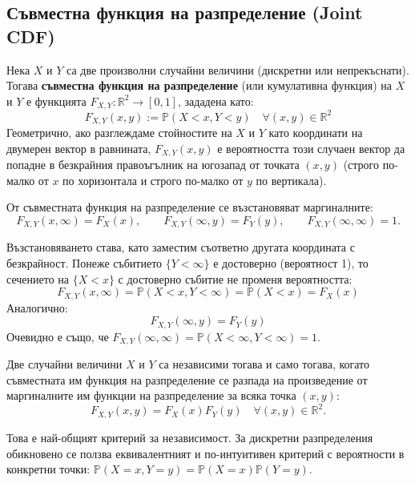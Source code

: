\subsection{Съвместна функция на разпределение (Joint CDF)}

\begin{defn}
Нека $X$ и $Y$ са две произволни случайни величини (дискретни или непрекъснати). Тогава \textbf{съвместна функция на разпределение} (или кумулативна функция) на $X$ и $Y$ е функцията $F_{X,Y} : \mathbb{R}^2 \to [0, 1]$, зададена като:
\[
F_{X,Y}(x,y) := \mathbb{P}(X < x, Y < y) \quad \forall (x,y) \in \mathbb{R}^2
\]
Геометрично, ако разглеждаме стойностите на $X$ и $Y$ като координати на двумерен вектор в равнината, $F_{X,Y}(x,y)$ е вероятността този случаен вектор да попадне в безкрайния правоъгълник на югозапад от точката $(x, y)$ (строго по-малко от $x$ по хоризонтала и строго по-малко от $y$ по вертикала).
\end{defn}

\begin{prop}\label{prop:marginal-from-joint}
От съвместната функция на разпределение се възстановяват маргиналните:
\[
F_{X,Y}(x, \infty) = F_X(x), \qquad F_{X,Y}(\infty, y) = F_Y(y), \qquad F_{X,Y}(\infty, \infty) = 1 .
\]
\end{prop}

Възстановяването става, като заместим съответно другата координата с безкрайност. Понеже събитието $\{Y < \infty\}$ е достоверно (вероятност 1), то сечението на $\{X < x\}$ с достоверно събитие не променя вероятността:
\[
F_{X,Y}(x, \infty) = \mathbb{P}(X < x, Y < \infty) = \mathbb{P}(X < x) = F_X(x)
\]
Аналогично:
\[
F_{X,Y}(\infty, y) = F_Y(y)
\]
Очевидно е също, че $F_{X,Y}(\infty, \infty) = \mathbb{P}(X < \infty, Y < \infty) = 1$.

\begin{keythm}\label{thm:indep-criterion}
Две случайни величини $X$ и $Y$ са независими тогава и само тогава, когато съвместната им функция на разпределение се разпада на произведение от маргиналните им функции на разпределение за всяка точка $(x,y)$:
\[
F_{X,Y}(x, y) = F_X(x) F_Y(y) \quad \forall (x,y) \in \mathbb{R}^2 .
\]
\end{keythm}

Това е най-общият критерий за независимост. За дискретни разпределения обикновено се ползва еквивалентният и по-интуитивен критерий с вероятности в конкретни точки: $\mathbb{P}(X = x, Y = y) = \mathbb{P}(X = x) \mathbb{P}(Y = y)$.

